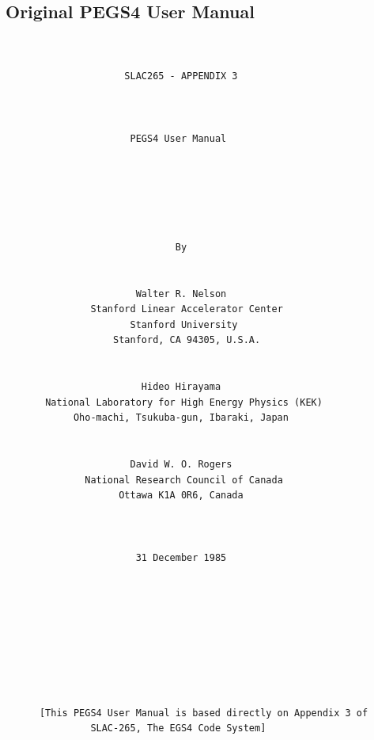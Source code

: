 \newpage
\subsection{Original PEGS4 User Manual}
\begin{verbatim}
 
 
                     SLAC265 - APPENDIX 3

 
 
                      PEGS4 User Manual
 
 
 
 
 
 
                              By
 
 
                       Walter R. Nelson
               Stanford Linear Accelerator Center
                      Stanford University
                   Stanford, CA 94305, U.S.A.
 
 
                        Hideo Hirayama
       National Laboratory for High Energy Physics (KEK)
            Oho-machi, Tsukuba-gun, Ibaraki, Japan
 
 
                      David W. O. Rogers
              National Research Council of Canada
                    Ottawa K1A 0R6, Canada
 
 
 
                       31 December 1985
 
 
 
 
 
 
 
 
 
      [This PEGS4 User Manual is based directly on Appendix 3 of 
               SLAC-265, The EGS4 Code System]
\end{verbatim}



